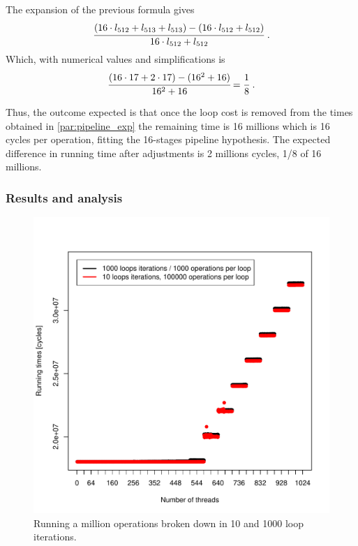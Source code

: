 \documentclass{report}
\def \scalingfactor{.8}
\begin{document}
    The expansion of the previous formula gives
    \[ \cfrac{(16\cdot l_{512} + l_{513} + l_{513}) - (16\cdot l_{512} + l_{512})}{16\cdot l_{512} + l_{512}} \text{  .}\]
    Which, with numerical values and simplifications is
    \[ \cfrac{(16\cdot 17 + 2\cdot 17) - (16^2 + 16)}{16^2 + 16} = \cfrac{1}{8}\text{  .}\] 

    Thus, the outcome expected is that once the loop cost is removed from the 
    times obtained in \ref{par:pipeline_exp} the remaining time is 16 millions
    which is 16 cycles per operation, fitting the 16-stages pipeline hypothesis.
    The expected difference in running time after adjustments is 2 millions cycles,
    1/8 of 16 millions.

	\subsubsection{Results and analysis}
    \begin{figure}[H]
		\centering
		\vspace{-20pt}
    			\includegraphics[width=\scalingfactor\linewidth]{"graphics/for-sizes-superpositions"}
		\vspace{-15pt}
		\captionsetup{justification=centering}
		\caption{Running a million operations broken down in 10 and 1000 loop iterations.}
        \label{fig:for-cost}
	\end{figure}
    
\end{document}
